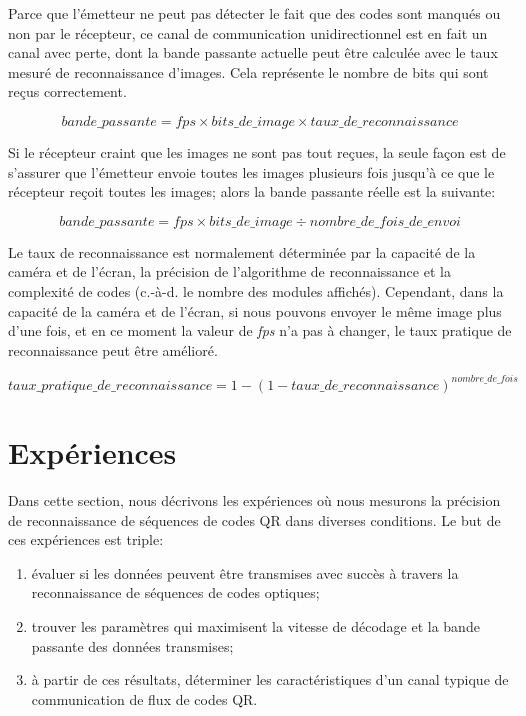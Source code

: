 Parce que l'émetteur ne peut pas détecter le fait que des codes sont manqués ou non par le récepteur, ce canal de communication unidirectionnel est en fait un canal avec perte, dont la bande passante actuelle peut être calculée avec le taux mesuré de reconnaissance d'images. Cela représente le nombre de bits qui sont reçus correctement.

\begin{equation*}
  bande\_passante = \mathit{fps} \times \mathit{bits\_de\_image} \times \mathit{taux\_de\_reconnaissance}
\end{equation*}

Si le récepteur craint que les images ne sont pas tout reçues, la seule façon est de s'assurer que l'émetteur envoie toutes les images plusieurs fois jusqu'à ce que le récepteur reçoit toutes les images; alors la bande passante réelle est la suivante:

\begin{equation*}
  bande\_passante = \mathit{fps} \times \mathit{bits\_de\_image} \div \mathit{nombre\_de\_fois\_de\_envoi}
\end{equation*}

Le taux de reconnaissance est normalement déterminée par la capacité de la caméra et de l'écran, la précision de l'algorithme de reconnaissance et la complexité de codes (c.-à-d. le nombre des modules affichés). Cependant, dans la capacité de la caméra et de l'écran, si nous pouvons envoyer le même image plus d'une fois, et en ce moment la valeur de \emph{fps} n'a pas à changer, le taux pratique de reconnaissance peut être amélioré.

\begin{equation*}
\mathit{taux\_pratique\_de\_reconnaissance} = 1 - (1 - \mathit{taux\_de\_reconnaissance})^{nombre\_de\_fois}
\end{equation*}



\section{Expériences}\label{sec:qr:experiments} %

Dans cette section, nous décrivons les expériences où nous mesurons la précision de reconnaissance de séquences de codes QR dans diverses conditions. Le but de ces expériences est triple:

\begin{enumerate}
\item évaluer si les données peuvent être transmises avec succès à travers la reconnaissance de séquences de codes optiques;
\item trouver les paramètres qui maximisent la vitesse de décodage et la bande passante des données transmises;
\item à partir de ces résultats, déterminer les caractéristiques d'un canal typique de communication de flux de codes QR.
\end{enumerate}

